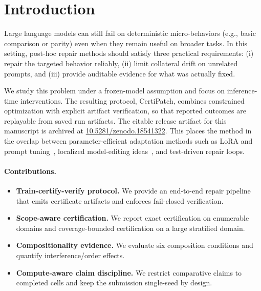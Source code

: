 \section{Introduction}
Large language models can still fail on deterministic micro-behaviors (e.g., basic comparison or parity) even when they remain useful on broader tasks.
In this setting, post-hoc repair methods should satisfy three practical requirements:
(i) repair the targeted behavior reliably, (ii) limit collateral drift on unrelated prompts, and (iii) provide auditable evidence for what was actually fixed.

We study this problem under a frozen-model assumption and focus on inference-time interventions.
The resulting protocol, CertiPatch, combines constrained optimization with explicit artifact verification, so that reported outcomes are replayable from saved run artifacts.
The citable release artifact for this manuscript is archived at \href{https://doi.org/10.5281/zenodo.18541322}{10.5281/zenodo.18541322}.
This places the method in the overlap between parameter-efficient adaptation methods such as LoRA and prompt tuning~\cite{hu2022lora,lester2021prompt},
localized model-editing ideas~\cite{meng2022rome,meng2023memit},
and test-driven repair loops.

\paragraph{Contributions.}
\begin{itemize}[leftmargin=*,nosep]
\item \textbf{Train-certify-verify protocol.} We provide an end-to-end repair pipeline that emits certificate artifacts and enforces fail-closed verification.
\item \textbf{Scope-aware certification.} We report exact certification on enumerable domains and coverage-bounded certification on a large stratified domain.
\item \textbf{Compositionality evidence.} We evaluate six composition conditions and quantify interference/order effects.
\item \textbf{Compute-aware claim discipline.} We restrict comparative claims to completed cells and keep the submission single-seed by design.
\end{itemize}
